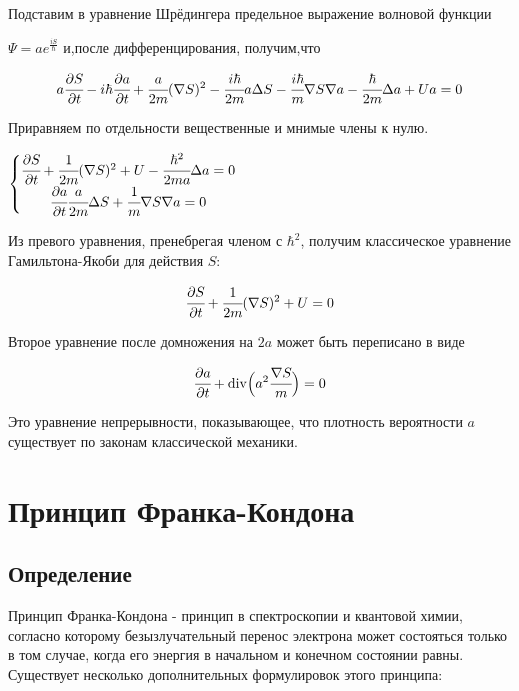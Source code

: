 \documentclass[a4paper,14pt,russian]{article}
\begin{document}
Подставим в уравнение Шрёдингера  предельное выражение волновой функции

$
\Psi = ae^{\frac{iS} {\hbar}}
$
и,после дифференцирования, получим,что

$$
a \cfrac {\partial S} {\partial t} - i \hbar \cfrac {\partial a} {\partial t} + \cfrac {a} {2m} (\nabla S) ^2 - \cfrac {i \hbar} {2m} a \Delta S - \cfrac {i \hbar} {m} \nabla S \nabla a - \cfrac {\hbar} {2m} \Delta a + Ua = 0
$$

Приравняем по отдельности вещественные и мнимые члены к нулю.

$
\left \{ 
\begin{matrix}

\cfrac {\partial S} {\partial t} + \cfrac {1} {2m} (\nabla S) ^2 + U - \cfrac {\hbar^2} {2ma} \Delta a = 0

\\

\cfrac {\partial a} {\partial t} \cfrac {a} {2m} \Delta S + \cfrac {1}{m} \nabla S \nabla a = 0

\end{matrix}
\right. 
$

Из превого уравнения, пренебрегая членом с 
$
\hbar^2
$, получим классическое уравнение Гамильтона-Якоби для действия
$
S
$:

$$
\cfrac {\partial S} {\partial t} + \cfrac {1} {2m} (\nabla S)^2 + U = 0
$$

Второе уравнение после домножения на 
$
2a
$
может быть переписано в виде

$$
\cfrac {\partial a} {\partial t} + \mathrm{div} \Big( a^2 \cfrac {\nabla S} {m} \Big) = 0
$$

Это уравнение непрерывности, показывающее, что плотность вероятности
$
a
$
существует по законам классической механики.

\newpage

\section{Принцип Франка-Кондона}

\subsection{Определение}

Принцип Франка-Кондона - принцип в спектроскопии и квантовой химии, согласно которому безызлучательный перенос электрона может состояться только в том случае, когда его энергия в начальном и конечном состоянии равны. Существует несколько дополнительных формулировок этого принципа:
\end{document}
